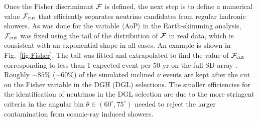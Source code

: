 \documentclass[reprint,showpacs,showkeys,amsmath,amssymb,aps,nofootinbib]{revtex4-1}
\begin{document}
Once the Fisher discriminant $\cal F$ is defined, the next
step is to define a numerical value ${\cal F}_{\rm cut}$ 
that efficiently separates neutrino candidates
from regular hadronic showers. 
As was done for the variable $\langle$AoP$\rangle$
in the Earth-skimming analysis, ${\cal F}_{\rm cut}$
was fixed using the tail of the distribution of $\cal F$ in real data, 
which is consistent with an exponential shape in all cases. An example
is shown in Fig.~\ref{fig:Fisher}. The tail 
was fitted and extrapolated to find the value of ${\cal F}_{\rm cut}$ 
corresponding to less than 1 expected event per 50 yr on the full SD array \cite{DGH,DGL}.
Roughly $\sim 85\%$ ($\sim 60\%$) of the simulated 
inclined $\nu$ events are kept after the cut on the Fisher variable 
in the DGH (DGL) selections. 
The smaller efficiencies for the identification of 
neutrinos in the DGL selection are due to the more stringent criteria in the angular bin $\theta \in (60^\circ, 75^\circ)$ 
needed to reject the larger contamination from cosmic-ray induced showers.
\end{document}
